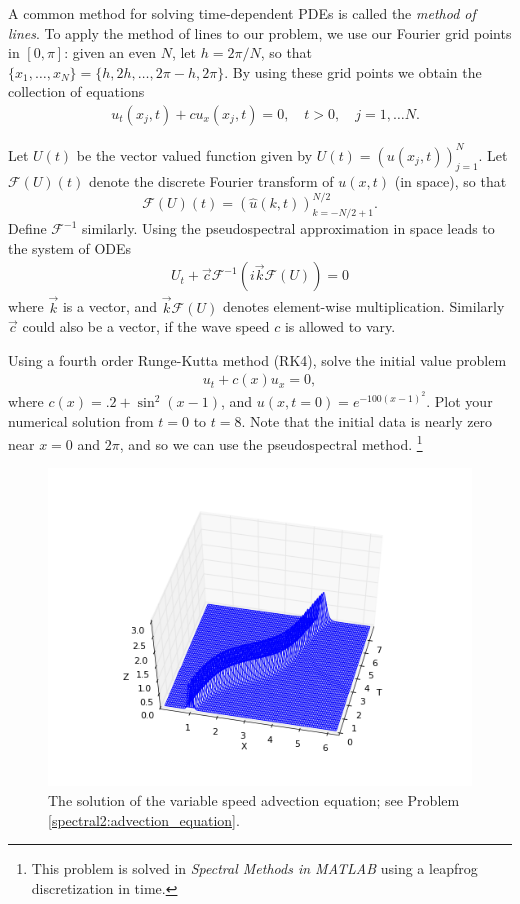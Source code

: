 A common method for solving time-dependent PDEs is called the \textit{method of lines}. To apply the method of lines to our problem, we use our Fourier grid points in $[0,\pi]$: given an even $N$, let $h = 2\pi/N$, so that $\{x_1,\ldots,x_N\} = \{h,2h,\ldots,2\pi-h,2\pi\}$.  By using these grid points we obtain the collection of equations
\begin{align}
&{ }u_t(x_j,t) + cu_x(x_j,t) = 0, \quad t >0, \quad j = 1, \ldots N. \label{spectral2:method_oflines}
\end{align}

Let $U(t)$ be the vector valued function given by $U(t) = (u(x_j,t))_{j=1}^N$.
Let $\mathcal{F}(U)(t)$ denote the discrete Fourier transform of $u(x,t)$ (in space), so that 
\[
\mathcal{F}(U)(t) = (\hat{u}(k,t))_{k=-N/2+1}^{N/2}.
\]
Define $\mathcal{F}^{-1}$ similarly.
Using the pseudospectral approximation in space leads to the system of ODEs
\begin{align}
	U_t +  \vec{c}\mathcal{F}^{-1}\left(i\vec{k}\mathcal{F}(U) \right) = 0
\end{align}
where $\vec{k}$ is a vector, and $\vec{k}\mathcal{F}(U) $ denotes element-wise multiplication. 
Similarly $\vec{c}$ could also be a vector, if the wave speed $c$ is allowed to vary. 


\begin{problem}
	Using a fourth order Runge-Kutta method (RK4), solve the initial value problem 
	\begin{align}
		u_t +c(x) u_x = 0,
	\end{align}
	where $c(x) = .2 + \sin^2(x-1)$, and $u(x,t=0) = e^{-100(x-1)^2}.$  Plot your numerical solution from $t = 0$ to $t = 8$.  Note that the initial data is nearly zero near $x = 0$ and  $2 \pi$, and so we can use the pseudospectral method. \footnote{This problem is solved in \textit{Spectral Methods in MATLAB} using a leapfrog discretization in time. } 
	\label{spectral2:advection_equation}
\end{problem}



\begin{figure}
\centering
\includegraphics[width=\textwidth]{advection.png}
\caption{The solution of the variable speed advection equation; see Problem  \ref{spectral2:advection_equation}.}
\label{fig:spectral:spectral2_advection}
\end{figure}





